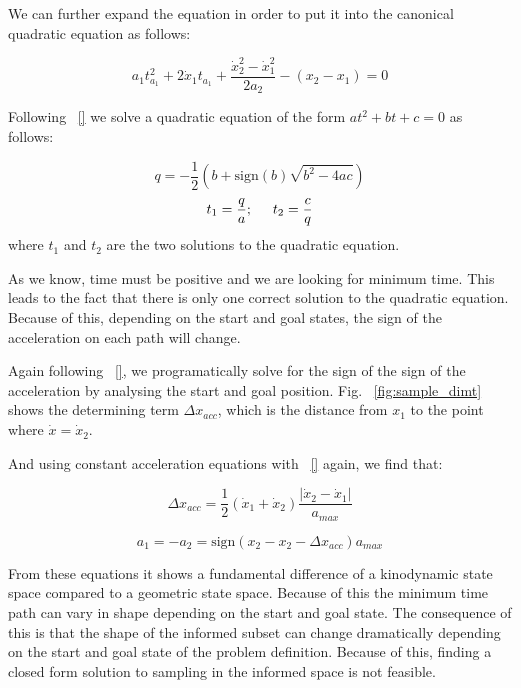\documentclass[letterpaper, 10 pt, conference]{ieeeconf}  %
\begin{document}
{We can further expand the equation in order to put it into the canonical quadratic equation as follows:

\begin{equation}
a_1 t_{a_1}^2 + 2 \dot{x}_1 t_{a_1} + \frac{\dot{x}_2^2 - \dot{x}_1^2}{2a_2} - \left(x_2 - x_1\right) = 0
\end{equation}

Following ~\ref{} we solve a quadratic equation of the form $at^2+bt+c=0$ as follows:

$$
q = -\frac{1}{2}\left(b + \text{sign}\left(b\right)\sqrt{b^2 - 4ac}\right)
$$
$$
t_1 = \frac{q}{a}; \hspace{5mm} t_2 = \frac{c}{q}
$$
where $t_1$ and $t_2$ are the two solutions to the quadratic equation.

As we know, time must be positive and we are looking for minimum time. This leads to the fact that there is only one correct solution to the quadratic equation. Because of this, depending on the start and goal states, the sign of the acceleration on each path will change.

Again following ~\ref{}, we programatically solve for the sign of the sign of the acceleration by analysing the start and goal position. Fig. ~\ref{fig:sample_dimt} shows the determining term $\Delta x_{acc}$, which is the distance from $x_1$ to the point where $\dot{x} = \dot{x}_2$. 

And using constant acceleration equations with ~\ref{} again, we find that:

\begin{equation}
\Delta x_{acc} = \frac{1}{2} \left(\dot{x}_1 + \dot{x}_2\right) \frac{|\dot{x}_2 - \dot{x}_1|}{a_{max}}
\end{equation}

\begin{equation}
a_1 = - a_2 = \text{sign}\left(x_2 - x_2 - \Delta x_{acc}\right) a_{max}
\end{equation}

From these equations it shows a fundamental difference of a kinodynamic state space compared to a geometric state space. Because of this the minimum time path can vary in shape depending on the start and goal state. The consequence of this is that the shape of the informed subset can change dramatically depending on the start and goal state of the problem definition. Because of this, finding a closed form solution to sampling in the informed space is not feasible.
}

\end{document}
